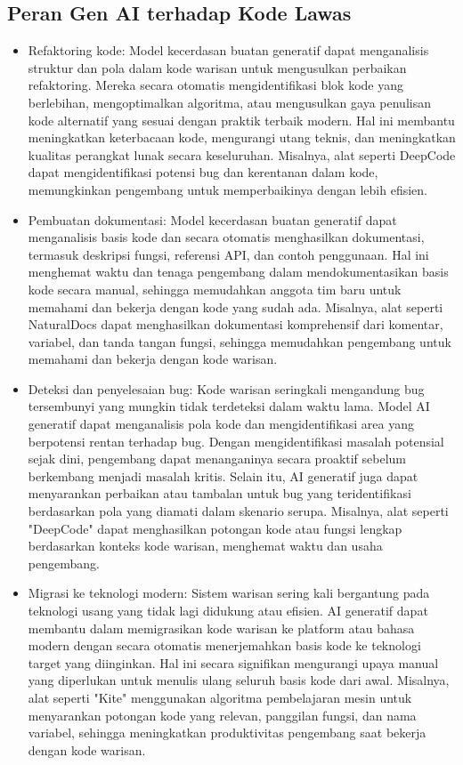 \documentclass{article}
\begin{document}
\subsection{Peran Gen AI terhadap Kode Lawas}
\begin{itemize}
    \item Refaktoring kode: Model kecerdasan buatan generatif dapat menganalisis struktur dan pola dalam kode warisan untuk mengusulkan perbaikan refaktoring. Mereka secara otomatis mengidentifikasi blok kode yang berlebihan, mengoptimalkan algoritma, atau mengusulkan gaya penulisan kode alternatif yang sesuai dengan praktik terbaik modern. Hal ini membantu meningkatkan keterbacaan kode, mengurangi utang teknis, dan meningkatkan kualitas perangkat lunak secara keseluruhan. Misalnya, alat seperti DeepCode dapat mengidentifikasi potensi bug dan kerentanan dalam kode, memungkinkan pengembang untuk memperbaikinya dengan lebih efisien.
    \item Pembuatan dokumentasi: Model kecerdasan buatan generatif dapat menganalisis basis kode dan secara otomatis menghasilkan dokumentasi, termasuk deskripsi fungsi, referensi API, dan contoh penggunaan. Hal ini menghemat waktu dan tenaga pengembang dalam mendokumentasikan basis kode secara manual, sehingga memudahkan anggota tim baru untuk memahami dan bekerja dengan kode yang sudah ada. Misalnya, alat seperti NaturalDocs dapat menghasilkan dokumentasi komprehensif dari komentar, variabel, dan tanda tangan fungsi, sehingga memudahkan pengembang untuk memahami dan bekerja dengan kode warisan.
    \item Deteksi dan penyelesaian bug: Kode warisan seringkali mengandung bug tersembunyi yang mungkin tidak terdeteksi dalam waktu lama. Model AI generatif dapat menganalisis pola kode dan mengidentifikasi area yang berpotensi rentan terhadap bug. Dengan mengidentifikasi masalah potensial sejak dini, pengembang dapat menanganinya secara proaktif sebelum berkembang menjadi masalah kritis. Selain itu, AI generatif juga dapat menyarankan perbaikan atau tambalan untuk bug yang teridentifikasi berdasarkan pola yang diamati dalam skenario serupa. Misalnya, alat seperti "DeepCode" dapat menghasilkan potongan kode atau fungsi lengkap berdasarkan konteks kode warisan, menghemat waktu dan usaha pengembang.
    \item Migrasi ke teknologi modern: Sistem warisan sering kali bergantung pada teknologi usang yang tidak lagi didukung atau efisien. AI generatif dapat membantu dalam memigrasikan kode warisan ke platform atau bahasa modern dengan secara otomatis menerjemahkan basis kode ke teknologi target yang diinginkan. Hal ini secara signifikan mengurangi upaya manual yang diperlukan untuk menulis ulang seluruh basis kode dari awal. Misalnya, alat seperti "Kite" menggunakan algoritma pembelajaran mesin untuk menyarankan potongan kode yang relevan, panggilan fungsi, dan nama variabel, sehingga meningkatkan produktivitas pengembang saat bekerja dengan kode warisan.
\end{itemize}
\end{document}
